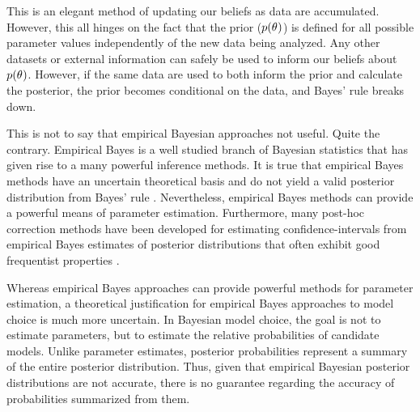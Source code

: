 \documentclass[letterpaper,12pt]{article}
\begin{document}
\begin{linenumbers}
This is an elegant method of updating our beliefs as data are accumulated.
However, this all hinges on the fact that the prior ($p(\theta_{})$) is
defined for all possible parameter values independently of the new data being
analyzed.
Any other datasets or external information can safely be used to inform our
beliefs about $p(\theta_{})$.
However, if the same data are used to both inform the prior and calculate the
posterior, the prior becomes conditional on the data, and Bayes' rule breaks
down.

This is not to say that empirical Bayesian approaches not useful.
Quite the contrary.
Empirical Bayes is a well studied branch of Bayesian statistics that
has given rise to a many powerful inference methods.
It is true that empirical Bayes methods have an uncertain theoretical basis and
do not yield a valid posterior distribution from Bayes' rule \citep[e.g.,
empirical Bayesian estimates of the posterior are often too narrow, off-center,
and misshapen;][]{Morris1983,Laird1987,Carlin1990,Efron2013}.
Nevertheless, empirical Bayes methods can provide a powerful means of parameter
estimation.
Furthermore, many post-hoc correction methods have been developed for
estimating confidence-intervals from empirical Bayes estimates of posterior
distributions that often exhibit good frequentist properties
\citep{Morris1983,Laird1987,Laird1989, Carlin1990,Hwang2009}.

Whereas empirical Bayes approaches can provide powerful methods for parameter
estimation, a theoretical justification for empirical Bayes approaches to model
choice is much more uncertain.
In Bayesian model choice, the goal is not to estimate parameters, but to
estimate the relative probabilities of candidate models.
Unlike parameter estimates, posterior probabilities represent a summary of the
entire posterior distribution.
Thus, given that empirical Bayesian posterior distributions are not accurate,
there is no guarantee regarding the accuracy of probabilities summarized from
them.


\end{linenumbers}
\end{document}
